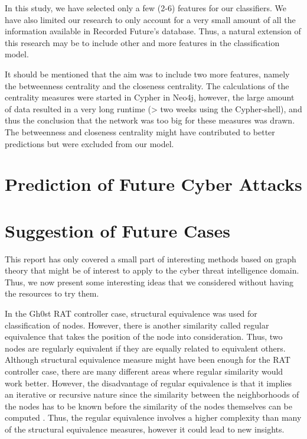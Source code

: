 In this study, we have selected only a few (2-6) features for our classifiers. We have also limited our research to only account for a very small amount of all the information available in Recorded Future's database. Thus, a natural extension of this research may be to include other and more features in the classification model. 

It should be mentioned that the aim was to include two more features, namely the betweenness centrality and the closeness centrality. The calculations of the centrality measures were started in Cypher in Neo4j, however, the large amount of data resulted in a very long runtime (> two weeks using the Cypher-shell), and thus the conclusion that the network was too big for these measures was drawn. The betweenness and closeness centrality might have contributed to better predictions but were excluded from our model.


\section{Prediction of Future Cyber Attacks}


\section{Suggestion of Future Cases}
This report has only covered a small part of interesting methods based on graph theory that might be of interest to apply to the cyber threat intelligence domain. Thus, we now present some interesting ideas that we considered without having the resources to try them. 

In the Gh0st RAT controller case, structural equivalence was used for classification of nodes. However, there is another similarity called regular equivalence that takes the position of the node into consideration. Thus, two nodes are regularly equivalent if they are equally related to equivalent others. Although structural equivalence measure might have been enough for the RAT controller case, there are many different areas where regular similarity would work better. However, the disadvantage of regular equivalence is that it implies an iterative or recursive nature since the similarity between the neighborhoods of the nodes has to be known before the similarity of the nodes themselves can be computed \cite{leicht2006}. Thus, the regular equivalence involves a higher complexity than many of the structural equivalence measures, however it could lead to new insights. 

